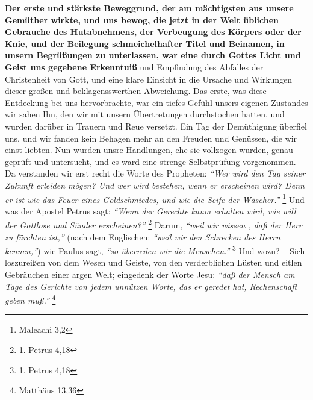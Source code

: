 \textbf{Der erste und stärkste Beweggrund, der am mächtigsten aus unsere Gemüther
wirkte, und uns bewog, die jetzt in der Welt üblichen Gebrauche des
Hutabnehmens, der Verbeugung des Körpers oder der Knie, und der Beilegung
schmeichelhafter Titel und Beinamen, in unsern Begrüßungen zu unterlassen, war
eine durch Gottes Licht und Geist uns gegebene Erkenntuiß} und Empfindung des
Abfalles der Christenheit von Gott, und eine klare Einsicht in die Ursache und
Wirkungen dieser großen und beklagensswerthen Abweichung. Das erste, was diese
Entdeckung bei uns hervorbrachte, war ein tiefes Gefühl unsers eigenen Zustandes
wir sahen Ihn, den wir mit unsern Übertretungen durchstochen hatten, und wurden
darüber in Trauern und Reue versetzt. Ein Tag der Demüthigung überfiel uns, und
wir fanden kein Behagen mehr an den Freuden und Genüssen, die wir einst liebten.
Nun wurden unsre Handlungen, ehe sie vollzogen wurden, genau geprüft und
untersucht, und es ward eine strenge Selbstprüfung vorgenommen. Da verstanden
wir erst recht die Worte des Propheten:
\textit{"`Wer wird den Tag seiner Zukunft
erleiden mögen? Und wer wird bestehen, wenn er erscheinen wird? Denn er ist wie
das Feuer eines Goldschmiedes, und wie die Seife der Wäscher."'}
\footnote{Maleachi 3,2}
Und was der Apostel Petrus sagt:
\textit{"`Wenn der Gerechte kaum erhalten wird, wie will der Gottlose und Sünder erscheinen?"'}
\footnote{1. Petrus 4,18}
Darum,
\textit{"`weil wir wissen , daß der Herr zu fürchten ist,"'}
(nach dem Englischen:
\textit{"`weil wir den Schrecken des Herrn kennen,"'}) wie Paulus sagt,
\textit{"`so überreden wir die Menschen."'}
\footnote{1. Petrus 4,18}
Und wozu? -- Sich loszureißen von dem Wesen
und Geiste, von den verderblichen Lüsten und eitlen Gebräuchen einer argen Welt;
eingedenk der Worte Jesu:
\textit{"`daß der Mensch am Tage des Gerichte von jedem
unnützen Worte, das er geredet hat, Rechenschaft geben muß."'}
\footnote{Matthäus 13,36}

\medskip

